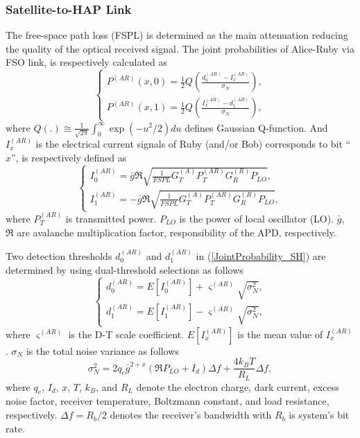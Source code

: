 \documentclass[conference]{IEEEtran}
\begin{document}
\subsubsection{Satellite-to-HAP Link}
The free-space path loss (FSPL) is determined as the main attenuation reducing the quality of the optical received signal. The joint probabilities of Alice-Ruby via FSO link, is respectively calculated as
\begin{equation}
\begin{cases}
\label{JointProbability_SH}
	P^{(AR)}(x,0)=\frac{1}{2}Q\left ( \frac{d_0^{(AR)}-I_x^{(AR)}}{\sigma_N} \right ),\\
	P^{(AR)}(x,1)=\frac{1}{2}Q\left ( \frac{I_x^{(AR)}-d_1^{(AR)}}{\sigma_N} \right),
\end{cases}
\end{equation}
where $Q(.)\cong\frac{1}{\sqrt{2\pi}}\int_{0}^{\infty}\exp (-u^2/2)du$ defines Gaussian Q-function. And $I^{(AR)}_x$ is the electrical current signals of Ruby (and/or Bob) corresponds to bit \enquote{$x$}, is respectively defined as
\begin{equation}
  \begin{cases}
    I_0^{(AR)}=\bar{g}\Re\sqrt{\frac{1}{FSPL}G_T^{(A)}P_T^{(AR)}G_{R}^{(R)}P_{LO}},\\
    I_1^{(AR)}=-\bar{g}\Re\sqrt{\frac{1}{FSPL}G_T^{(A)}P_T^{(AR)}G_{R}^{(R)}P_{LO}},
  \end{cases}
\end{equation}
where $P_T^{(AR)}$ is transmitted power. $P_{LO}$ is the power of local oscillator (LO). $\bar{g}$, $\Re$ are avalanche multiplication factor, responsibility of the APD, respectively.

Two detection thresholds $d_0^{(AR)}$ and $d_1^{(AR)}$ in (\ref{JointProbability_SH}) are determined by using dual-threshold selections as follows
\begin{equation}
  \begin{cases}
    d_0^{(AR)}=E[I_0^{(AR)}]+\varsigma^{(AR)} \sqrt{\sigma _N^2},\\
    d_1^{(AR)}=E[I_1^{(AR)}]-\varsigma^{(AR)} \sqrt{\sigma _N^2},
  \end{cases}
\end{equation}
where $\varsigma^{(AR)}$ is the D-T scale coefficient. $E[I^{(AR)}_x]$ is the mean value of $I^{(AR)}_x$. $\sigma_N$ is the total noise variance as follows
\begin{equation}
\label{eq:sigman2}
	\sigma_N^{2}=2q_e\bar{g}^{2+x}(\Re P_{LO}+I_d)\Delta f+\frac{4k_BT}{R_L}\Delta f,
\end{equation}
where $q_e$, $I_d$, $x$, $T$, $k_B$, and $R_L$ denote the electron charge, dark current, excess noise factor, receiver temperature, Boltzmann constant, and load resistance, respectively. $\Delta f\!\!\!=\!\!\!R_b/2$ denotes the receiver’s bandwidth with $R_b$ is system's bit rate.
\end{document}
